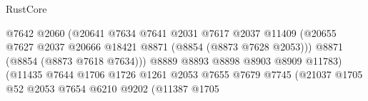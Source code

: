 \begin{lexlean}{RustCore}
\begin{coremodule}
                                                      @7642
                                                      @2060
                                                      (@20641
                                                        @7634
                                                        @7641
                                                        @2031
                                                        @7617
                                                        @2037
                                                        @11409
                                                        (@20655
                                                          @7627
                                                          @2037
                                                          @20666
                                                          @18421
                                                          @8871
                                                          (@8854 (@8873 @7628 @2053)))
                                                        @8871
                                                        (@8854 (@8873 @7618 @7634)))
                                                      @8889
                                                      @8893
                                                      @8898
                                                      @8903
                                                      @8909
                                                      @11783)
                                                    (@11435
                                                      @7644
                                                      @1706
                                                      @1726
                                                      @1261
                                                      @2053
                                                      @7655
                                                      @7679
                                                      @7745
                                                      (@21037
                                                        @1705
                                                        @52
                                                        @2053
                                                        @7654
                                                        @6210
                                                        @9202
                                                        (@11387
                                                          @1705

\end{coremodule}
\end{lexlean}
